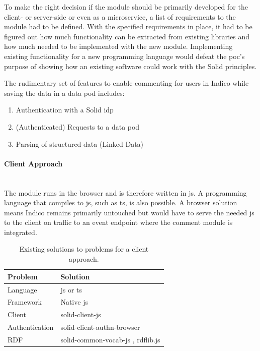 To make the right decision if the module should be primarily developed for the client- or server-side or even as a microservice, a list of requirements to the module had to be defined. With the specified requirements in place, it had to be figured out how much functionality can be extracted from existing libraries and how much needed to be implemented with the new module. Implementing existing functionality for a new programming language would defeat the \gls{poc}’s purpose of showing how an existing software could work with the Solid principles.

The rudimentary set of features to enable commenting for users in Indico while saving the data in a data pod includes: 
\begin{enumerate}
    \item Authentication with a Solid \gls{idp}
    \item (Authenticated) Requests to a data pod
    \item Parsing of structured data (Linked Data)
\end{enumerate}
\vspace{0.5cm}
\paragraph{Client Approach}\mbox{}\\

The module runs in the browser and is therefore written in \gls{js}. A programming language that compiles to \gls{js}, such as \gls{ts}, is also possible. A browser solution means Indico remains primarily untouched but would have to serve the needed \gls{js} to the client on traffic to an event endpoint where the comment module is integrated.

\begin{table}[h!]
    \centering
    \begin{tabular}{| l | l |} 
     \hline
     Problem & Solution \\
     \hline
      Language & \gls{js} or \gls{ts}  \\
      Framework & Native \gls{js}  \\
      Client & solid-client-js \cite{solid-client-js}  \\
      Authentication & solid-client-authn-browser \cite{solid-client-authn-browser} \\
      RDF & solid-common-vocab-js \cite{solid-common-vocab-js}, rdflib.js \cite{rdflib-js}  \\
     \hline
    \end{tabular}
    \vspace{0.75cm}
    \caption{Existing solutions to problems for a client approach.}
    \label{table:1}
\end{table}

